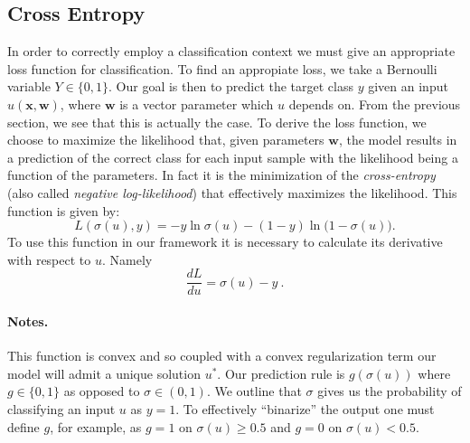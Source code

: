 \documentclass{INGUADY}
\begin{document}
\subsection{Cross Entropy}
In order to correctly employ a classification context we must give an appropriate loss function for classification. To find an appropiate loss, we take a Bernoulli variable $Y \in \{  0, 1 \}$. Our goal is then to predict the target class $y$ given an input $u(\mathbf{x}, \mathbf{w})$, where $\mathbf{w}$ is a vector parameter which $u$ depends on. From the previous section, we see that this is actually the case. To derive the loss function, we choose to maximize the likelihood that, given parameters $\mathbf{w}$, the model results in a prediction of the correct class for each input sample with the likelihood being a function of the parameters. In fact it is the minimization of the \textit{cross-entropy} \cite{crossentrop} (also called \textit{negative log-likelihood}) that effectively maximizes the likelihood. This function is given by:
\begin{equation*}
L(\sigma(u), y) =  - y \ln \sigma(u) - (1 - y) \ln \big(  1-  \sigma(u)  \big) . \label{eq:cross_entropy}
\end{equation*}
To use this function in our framework it is necessary to calculate its derivative with respect to $u$. Namely
\begin{equation*}
\dfrac{dL}{du} = \sigma(u) - y \ .
\end{equation*}

\paragraph{Notes.} This function is convex and so coupled with a convex regularization term our model will admit a unique solution $u^*$. Our prediction rule is $g(\sigma(u))$ where $g \in \{ 0, 1\}$ as opposed to $\sigma \in (0, 1)$. We outline that $\sigma$ gives us the probability of classifying an input $u$ as $y = 1$. To effectively ``binarize'' the output one must define $g$, for example, as $g = 1$ on $\sigma(u) \geq 0.5$ and $g = 0$ on $\sigma(u) < 0.5$.
\end{document}
